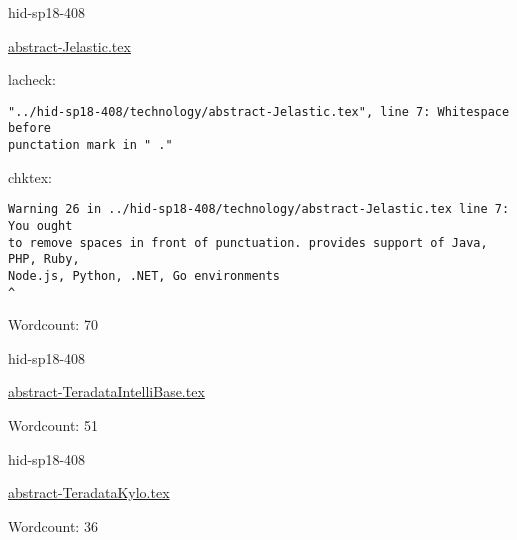 

\begin{IU}

hid-sp18-408

\href{https://github.com/cloudmesh-community/hid-sp18-408/blob/master//technology/abstract-Jelastic.tex}{abstract-Jelastic.tex}

 
lacheck:
\begin{tiny}
\begin{verbatim}
"../hid-sp18-408/technology/abstract-Jelastic.tex", line 7: Whitespace before
punctation mark in " ."
\end{verbatim}
\end{tiny}
chktex:
\begin{tiny}
\begin{verbatim}
Warning 26 in ../hid-sp18-408/technology/abstract-Jelastic.tex line 7: You ought
to remove spaces in front of punctuation. provides support of Java, PHP, Ruby,
Node.js, Python, .NET, Go environments
^
\end{verbatim}
\end{tiny}

Wordcount: 70

\end{IU}



\begin{IU}

hid-sp18-408

\href{https://github.com/cloudmesh-community/hid-sp18-408/blob/master//technology/abstract-TeradataIntelliBase.tex}{abstract-TeradataIntelliBase.tex}

 

Wordcount: 51

\end{IU}



\begin{IU}

hid-sp18-408

\href{https://github.com/cloudmesh-community/hid-sp18-408/blob/master//technology/abstract-TeradataKylo.tex}{abstract-TeradataKylo.tex}

 

Wordcount: 36

\end{IU}



